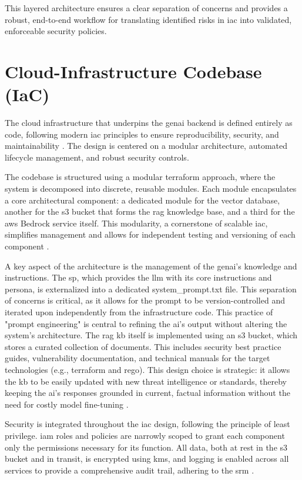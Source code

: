 This layered architecture ensures a clear separation of concerns and provides a robust, end-to-end workflow for translating identified risks in \gls{iac} into validated, enforceable security policies.

\section{Cloud-Infrastructure Codebase (IaC)}

The cloud infrastructure that underpins the \gls{genai} backend is defined entirely as code, following modern \gls{iac} principles to ensure reproducibility, security, and maintainability \cite{dasari_infrastructure_2025}. The design is centered on a modular architecture, automated lifecycle management, and robust security controls.

The codebase is structured using a modular \gls{terraform} approach, where the system is decomposed into discrete, reusable modules. Each module encapsulates a core architectural component: a dedicated module for the vector database, another for the \gls{s3} bucket that forms the \gls{rag} knowledge base, and a third for the \gls{aws} Bedrock service itself. This modularity, a cornerstone of scalable \gls{iac}, simplifies management and allows for independent testing and versioning of each component \cite{howard_terraform_2022}.

A key aspect of the architecture is the management of the \gls{genai}'s knowledge and instructions. The \gls{sp}, which provides the \gls{llm} with its core instructions and persona, is externalized into a dedicated system\_prompt.txt file. This separation of concerns is critical, as it allows for the prompt to be version-controlled and iterated upon independently from the infrastructure code. This practice of "prompt engineering" is central to refining the \gls{ai}'s output without altering the system's architecture. The \gls{rag} \gls{kb} itself is implemented using an \gls{s3} bucket, which stores a curated collection of documents. This includes security best practice guides, vulnerability documentation, and technical manuals for the target technologies (e.g., \gls{terraform} and \gls{rego}). This design choice is strategic: it allows the \gls{kb} to be easily updated with new threat intelligence or standards, thereby keeping the \gls{ai}'s responses grounded in current, factual information without the need for costly model fine-tuning \cite{lewis_retrieval-augmented_2021}.

Security is integrated throughout the \gls{iac} design, following the principle of least privilege. \gls{iam} roles and policies are narrowly scoped to grant each component only the permissions necessary for its function. All data, both at rest in the \gls{s3} bucket and in transit, is encrypted using \gls{kms}, and logging is enabled across all services to provide a comprehensive audit trail, adhering to the \gls{srm} \cite{noauthor_aws_nodate}.

